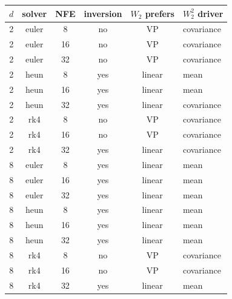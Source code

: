 \begin{tabular}{cccccl}
\toprule
$d$ & solver & NFE & inversion & $W_2$ prefers & $W_2^2$ driver \\
\midrule
2 & euler & 8 & no & VP & covariance \\
2 & euler & 16 & no & VP & covariance \\
2 & euler & 32 & no & VP & covariance \\
2 & heun & 8 & yes & linear & mean \\
2 & heun & 16 & yes & linear & mean \\
2 & heun & 32 & yes & linear & covariance \\
2 & rk4 & 8 & no & VP & covariance \\
2 & rk4 & 16 & no & VP & covariance \\
2 & rk4 & 32 & yes & linear & covariance \\
8 & euler & 8 & yes & linear & mean \\
8 & euler & 16 & yes & linear & mean \\
8 & euler & 32 & yes & linear & mean \\
8 & heun & 8 & yes & linear & mean \\
8 & heun & 16 & yes & linear & mean \\
8 & heun & 32 & yes & linear & mean \\
8 & rk4 & 8 & no & VP & covariance \\
8 & rk4 & 16 & no & VP & covariance \\
8 & rk4 & 32 & yes & linear & mean \\
\bottomrule
\end{tabular}

